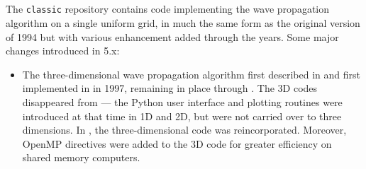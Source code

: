 %
%
%

\subsection{\classic}
The \texttt{classic} repository contains code implementing the wave
propagation algorithm on a single uniform grid, in much the same form as the
original  version of 1994 but with various enhancement added
through the years.  Some major changes introduced in \clawpack 5.x:
\begin{itemize}
    \item The three-dimensional wave propagation algorithm first described
in \cite{jol:thesis, jol-rjl:3d} 
and first implemented in  in 1997, remaining in place through
.  The 3D codes 
disappeared from  --- the Python user interface and plotting
routines were introduced at that time in 1D and 2D, but were not 
carried over to three dimensions.  In , the three-dimensional
code was reincorporated.  Moreover, OpenMP directives were added to the 3D code
for greater efficiency on shared memory computers.


\end{itemize}
